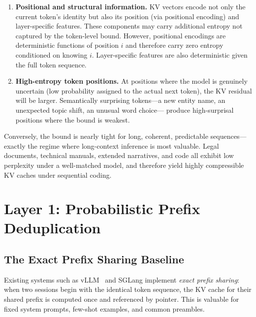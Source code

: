 \documentclass[11pt]{article}
\begin{document}
\begin{enumerate}[leftmargin=2em]
  \item \textbf{Positional and structural information.}  KV vectors encode not
        only the current token's identity but also its position (via positional
        encoding) and layer-specific features.  These components may carry
        additional entropy not captured by the token-level bound.  However,
        positional encodings are deterministic functions of position $i$ and
        therefore carry zero entropy conditioned on knowing $i$.  Layer-specific
        features are also deterministic given the full token sequence.

  \item \textbf{High-entropy token positions.}  At positions where the model is
        genuinely uncertain (low probability assigned to the actual next token),
        the KV residual will be larger.  Semantically surprising tokens---a
        new entity name, an unexpected topic shift, an unusual word choice---
        produce high-surprisal positions where the bound is weakest.
\end{enumerate}

Conversely, the bound is nearly tight for long, coherent, predictable
sequences---exactly the regime where long-context inference is most valuable.
Legal documents, technical manuals, extended narratives, and code all exhibit
low perplexity under a well-matched model, and therefore yield highly
compressible KV caches under sequential coding.

\section{Layer 1: Probabilistic Prefix Deduplication}
\label{sec:prefix_dedup}

\subsection{The Exact Prefix Sharing Baseline}

Existing systems such as vLLM~\cite{kwon2023vllm} and SGLang implement
\emph{exact prefix sharing}: when two sessions begin with the identical token
sequence, the KV cache for their shared prefix is computed once and referenced
by pointer.  This is valuable for fixed system prompts, few-shot examples, and
common preambles.
\end{document}
